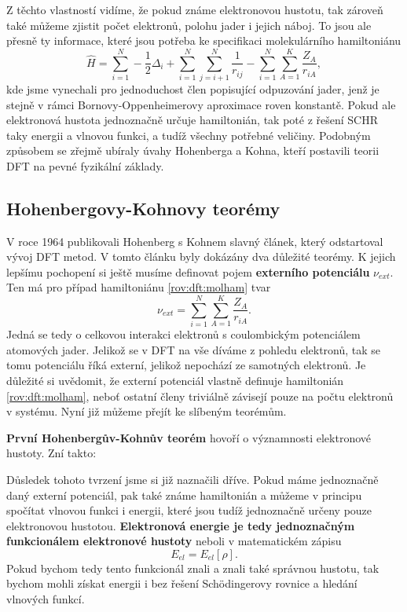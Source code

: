 Z těchto vlastností vidíme, že pokud známe elektronovou hustotu, tak zároveň také můžeme zjistit počet elektronů, polohu jader i jejich náboj. To jsou ale přesně ty informace, které jsou potřeba ke specifikaci molekulárního hamiltoniánu
\begin{equation}
\hat{H}=\sum_{i=1}^N -\frac{1}{2}\Delta_i+\sum_{i=1}^N\sum_{j=i+1}^N\frac{1}{r_{ij}}-\sum_{i=1}^N\sum_{A=1}^K \frac{Z_A}{r_{iA}} ,
\label{rov:dft:molham}
\end{equation}
kde jsme vynechali pro jednoduchost člen popisující odpuzování jader, jenž je stejně v rámci Bornovy-Oppenheimerovy aproximace roven konstantě. Pokud ale elektronová hustota jednoznačně určuje hamiltonián, tak poté z řešení SCHR taky energii a vlnovou funkci, a tudíž všechny potřebné veličiny. Podobným způsobem se zřejmě ubíraly úvahy Hohenberga a Kohna, kteří postavili teorii DFT na pevné fyzikální základy.

\subsection{Hohenbergovy-Kohnovy teorémy}

V roce 1964 publikovali Hohenberg s Kohnem slavný článek, který odstartoval vývoj DFT metod.
V tomto článku byly dokázány dva důležité teorémy. K jejich lepšímu pochopení si ještě musíme definovat pojem \textbf{externího potenciálu} $\nu_{ext}$. Ten má pro případ hamiltoniánu \eqref{rov:dft:molham} tvar
\begin{equation}
\nu_{ext} = \sum_{i=1}^N\sum_{A=1}^K \frac{Z_A}{r_{iA}} .
\end{equation} 
Jedná se tedy o celkovou interakci elektronů s coulombickým potenciálem atomových jader. Jelikož se v DFT na vše díváme z pohledu elektronů, tak se tomu potenciálu říká externí, jelikož nepochází ze samotných elektronů. Je důležité si uvědomit, že externí potenciál vlastně definuje hamiltonián \eqref{rov:dft:molham}, neboť ostatní členy triviálně závisejí pouze na počtu elektronů v systému. Nyní již můžeme přejít ke slíbeným teorémům.

\textbf{První Hohenbergův-Kohnův teorém} hovoří o významnosti elektronové hustoty. Zní takto:

\bigskip
\noindent {}

\bigskip
Důsledek tohoto tvrzení jsme si již naznačili dříve. Pokud máme jednoznačně daný externí potenciál, pak také známe hamiltonián a můžeme v principu spočítat vlnovou funkci i energii, které jsou tudíž jednoznačně určeny pouze elektronovou hustotou. \textbf{Elektronová energie je tedy jednoznačným funkcionálem elektronové hustoty} neboli v matematickém zápisu
\begin{equation}
E_{el}=E_{el}[\rho] .
\end{equation}
Pokud bychom tedy tento funkcionál znali a znali také správnou hustotu, tak bychom mohli získat energii i bez řešení Sch\"{o}dingerovy rovnice a hledání vlnových funkcí.

